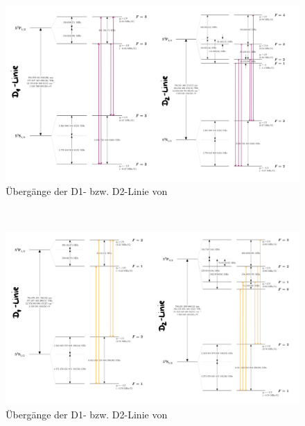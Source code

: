 \begin{figure}[h]
    \centering
    \includegraphics[scale=0.25]{Bilder/FzV/Hyp85.jpg}
    \caption{Übergänge der D1- bzw. D2-Linie von }
   \end{figure}\\
   \begin{figure}[h]
    \centering
    \includegraphics[scale=0.25]{Bilder/FzV/Hyp87.jpg}
    \caption{Übergänge der D1- bzw. D2-Linie von }
   \end{figure}\\
